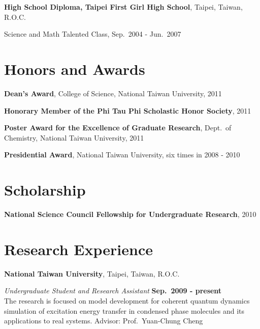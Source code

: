 \documentclass[margin,line, 11pt, a4paper]{res}
\newenvironment{list1}{
  \begin{list}{\ding{113}}{%
      \setlength{\itemsep}{0in}
      \setlength{\parsep}{0in} \setlength{\parskip}{0in}
      \setlength{\topsep}{0in} \setlength{\partopsep`}{0in} 
      \setlength{\leftmargin}{0.17in}}}{\end{list}}
\begin{document}
\begin{resume}
{\bf High School Diploma, Taipei First Girl High School}, Taipei, Taiwan, R.O.C.\\
\vspace*{-.1in}
\begin{list1}
\item[]Science and Math Talented Class, Sep.~2004 - Jun.~2007
\end{list1}


\section{\sc Honors and Awards} 
{\bf Dean's Award}, College of Science, National Taiwan University, 2011

\vspace*{-2.5mm}
{\bf Honorary Member of the Phi Tau Phi Scholastic Honor Society}, 2011

\vspace*{-2.5mm}
{\bf Poster Award for the Excellence of Graduate Research}, Dept.~of Chemistry, National Taiwan University, 2011

\vspace*{-2.5mm}
{\bf Presidential Award}, National Taiwan University, six times in 2008 - 2010


\section{\sc Scholarship}
{\bf National Science Council Fellowship for Undergraduate Research}, 2010

\section{\sc Research Experience}
{\bf National Taiwan University}, Taipei, Taiwan, R.O.C.

\vspace{-.3cm}
{\em Undergraduate Student and Research Assistant} \hfill {\bf Sep.~2009 - present}\\
The research is focused on model development for coherent quantum dynamics simulation of excitation energy transfer in condensed phase molecules and its applications to real systems. 
Advisor: Prof.~Yuan-Chung Cheng



\end{resume}
\end{document}
